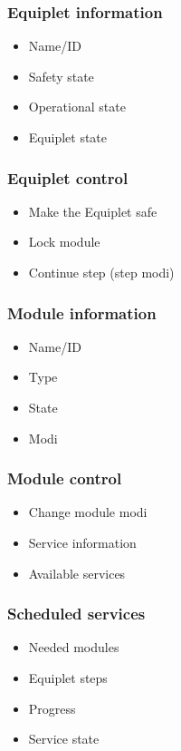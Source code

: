 \documentclass[12pt,a4paper]{report}
\begin{document}
\subsubsection{Equiplet information}
\begin{itemize}
\item Name/ID
\item Safety state
\item Operational state
\item Equiplet state
\end{itemize}
\subsubsection{Equiplet control}
\begin{itemize}
\item Make the Equiplet safe
\item Lock module
\item Continue step (step modi)
\end{itemize}
\subsubsection{Module information}
\begin{itemize}
\item Name/ID
\item Type
\item State
\item Modi
\end{itemize}
\subsubsection{Module control}
\begin{itemize}
\item Change module modi
\item Service information
\item Available services
\end{itemize}
\subsubsection{Scheduled services}
\begin{itemize}
\item Needed modules
\item Equiplet steps
\item Progress
\item Service state
\end{itemize}
\end{document}
